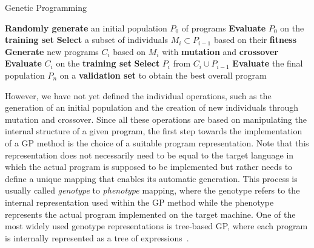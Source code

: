 \begin{algorithm}[t]
	\caption{Genetic Programming}
	\label{alg:genetic-programming}
	\begin{algorithmic}[1] %
		\State \textbf{Randomly generate} an initial population $P_0$ of programs
		\State \textbf{Evaluate} $P_0$ on the \textbf{training set} 
		\State \textbf{Select} a subset of individuals $M_i \subset P_{i-1}$ based on their \textbf{fitness}
		\State \textbf{Generate} new programs $C_i$ based on $M_i$ with \textbf{mutation} and \textbf{crossover}
		\State \textbf{Evaluate} $C_i$ on the \textbf{training set} 
		\State \textbf{Select} $P_{i}$ from $C_i \cup P_{i-1}$
		\EndFor
		\State \textbf{Evaluate} the final population $P_{n}$ on a \textbf{validation set}  to obtain the best overall program
	\end{algorithmic}
\end{algorithm}
However, we have not yet defined the individual operations, such as the generation of an initial population and the creation of new individuals through mutation and crossover.
Since all these operations are based on manipulating the internal structure of a given program, the first step towards the implementation of a GP method is the choice of a suitable program representation.
Note that this representation does not necessarily need to be equal to the target language in which the actual program is supposed to be implemented but rather needs to define a unique mapping that enables its automatic generation.
This process is usually called \emph{genotype} to \emph{phenotype} mapping, where the genotype refers to the internal representation used within the GP method while the phenotype represents the actual program implemented on the target machine.
One of the most widely used genotype representations is tree-based GP, where each program is internally represented as a tree of expressions~\cite{koza1994genetic,poli2008field}.
